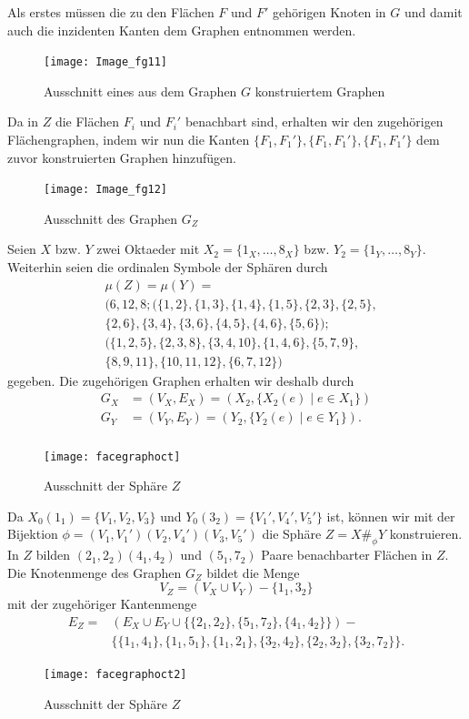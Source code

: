 \documentclass[12pt,titlepage,twoside,cleardoublepage]{article}
\theoremstyle{nummermitklammern}
\numberwithin{equation}{section}
\begin{document}
Als erstes müssen die zu den Flächen $F$ und $F'$ gehörigen Knoten in $G$ und damit auch die inzidenten Kanten dem Graphen entnommen werden. 
\begin{figure}[H]
\begin{center}
\texttt{[image: Image\_fg11]}
\end{center}
\caption{Ausschnitt eines aus dem Graphen $G$ konstruiertem Graphen}
\end{figure}
Da in $Z$ die Flächen $F_i$ und $F_i'$ benachbart sind, erhalten wir den zugehörigen Flächengraphen, indem wir nun die Kanten $\{F_1,F_1'\},\{F_1,F_1'\},\{F_1,F_1'\}$ dem zuvor konstruierten Graphen hinzufügen. 
\begin{figure}[H]
\begin{center}
\texttt{[image: Image\_fg12]}
\end{center}
\caption{Ausschnitt des Graphen $G_Z$}
\end{figure}
 Seien $X$ bzw. $Y$ zwei Oktaeder mit $X_2=\{1_X,\ldots,8_X\}$ bzw. $Y_2=\{1_Y,\ldots,8_Y\}.$
Weiterhin seien die ordinalen Symbole der Sphären durch
\begin{align*}
&\mu(Z)= \mu(Y)=\\
 &(6,12,8;(\{1,2\},\{1,3\},\{1,4\},\{1,5\},\{2,3\},\{2,5\},\\
 &\{2,6\},\{3,4\},\{3,6\},\{4,5\},\{4,6\},\{5,6\});\\
 &(\{1,2,5\},\{2,3,8\},\{3,4,10\},\{1,4,6\},\{5,7,9\},\\&\{8,9,11\},\{10,11,12\},\{6,7,12\})
 \end{align*}
 gegeben. Die zugehörigen Graphen erhalten wir deshalb durch 
\begin{align*}
G_X&=(V_X,E_X)=(X_2,\{X_2(e)\mid e\in X_1\})\\G_Y&=(V_Y,E_Y)=(Y_2,\{Y_2(e)\mid e\in Y_1\}).\\
\end{align*}
 \begin{figure}[H]
\begin{center}
\texttt{[image: facegraphoct]}
\end{center}
\caption{Ausschnitt der Sphäre $Z$}
\end{figure}   
Da $X_0(1_1)=\{V_1,V_2,V_3\}$ und $Y_0(3_2)=\{V_1',V_4',V_5'\}$ ist, können wir mit der Bijektion $\phi=(V_1,V_1')(V_2,V_4')(V_3,V_5')$ die Sphäre $Z=X\#_\phi Y$ konstruieren. In $Z$ bilden $(2_1,2_2)(4_1,4_2)$ und $(5_1,7_2)$ Paare benachbarter Flächen in $Z.$
Die Knotenmenge des Graphen $G_Z$ bildet die Menge 
\[
V_Z=(V_X \cup V_Y)-\{1_1,3_2\}
\]
mit der zugehöriger Kantenmenge 
\begin{align*}
E_Z=&(E_X \cup E_Y\cup \{\{2_1,2_2\},\{5_1,7_2\},\{4_1,4_2\}\})-\\
&\{\{1_1,4_1\},\{1_1,5_1\},\{1_1,2_1\},\{3_2,4_2\},\{2_2,3_2\},\{3_2,7_2\}\}.
\end{align*}
\begin{figure}[H]
\begin{center}
\texttt{[image: facegraphoct2]}
\end{center}
\caption{Ausschnitt der Sphäre $Z$}
\end{figure}   
\end{document}
